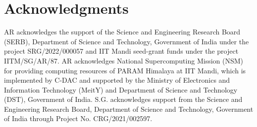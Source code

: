 \documentclass[pra,twocolumn,aps,superscriptaddress,showpacs,longbibliography]{revtex4-1}
\begin{document}
\section*{Acknowledgments}
AR acknowledges the support of the Science and Engineering Research Board (SERB), Department of Science and Technology, Government of India under the project SRG/2022/000057 and IIT Mandi seed-grant funds under the project IITM/SG/AR/87. AR acknowledges National Supercomputing Mission (NSM) for providing computing resources of PARAM Himalaya at IIT Mandi, which is implemented by C-DAC and supported by the Ministry of Electronics and Information Technology (MeitY) and Department of Science and Technology (DST), Government of India. S.G. acknowledges support from the Science and Engineering Research Board, Department
of Science and Technology, Government of India through Project No. CRG/2021/002597.
\end{document}
